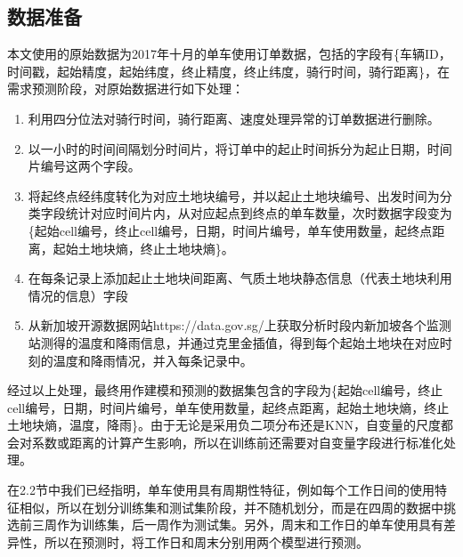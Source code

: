 \documentclass[]{tongjithesis}
\numberwithin{equation}{chapter}
\begin{document}
\subsection{数据准备}
本文使用的原始数据为2017年十月的单车使用订单数据，包括的字段有\{车辆ID，时间戳，起始精度，起始纬度，终止精度，终止纬度，骑行时间，骑行距离\}，在需求预测阶段，对原始数据进行如下处理：
\begin{enumerate}
	\item 利用四分位法对骑行时间，骑行距离、速度处理异常的订单数据进行删除。
	\item 以一小时的时间间隔划分时间片，将订单中的起止时间拆分为起止日期，时间片编号这两个字段。
	\item 将起终点经纬度转化为对应土地块编号，并以起止土地块编号、出发时间为分类字段统计对应时间片内，从对应起点到终点的单车数量，次时数据字段变为\{起始cell编号，终止cell编号，日期，时间片编号，单车使用数量，起终点距离，起始土地块熵，终止土地块熵\}。
	\item 在每条记录上添加起止土地块间距离、气质土地块静态信息（代表土地块利用情况的信息）字段
	\item 从新加坡开源数据网站https://data.gov.sg/上获取分析时段内新加坡各个监测站测得的温度和降雨信息，并通过克里金插值，得到每个起始土地块在对应时刻的温度和降雨情况，并入每条记录中。
\end{enumerate}

经过以上处理，最终用作建模和预测的数据集包含的字段为\{起始cell编号，终止cell编号，日期，时间片编号，单车使用数量，起终点距离，起始土地块熵，终止土地块熵，温度，降雨\}。由于无论是采用负二项分布还是KNN，自变量的尺度都会对系数或距离的计算产生影响，所以在训练前还需要对自变量字段进行标准化处理。

在2.2节中我们已经指明，单车使用具有周期性特征，例如每个工作日间的使用特征相似，所以在划分训练集和测试集阶段，并不随机划分，而是在四周的数据中挑选前三周作为训练集，后一周作为测试集。另外，周末和工作日的单车使用具有差异性，所以在预测时，将工作日和周末分别用两个模型进行预测。
\end{document}
